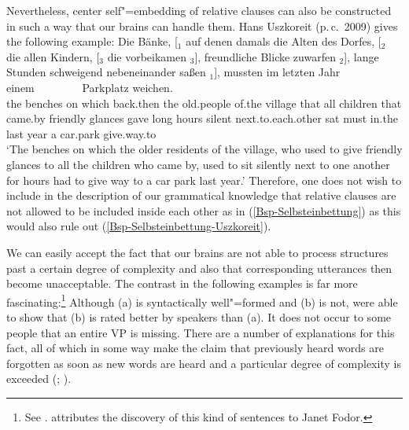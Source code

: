 Nevertheless, center self"=embedding of relative clauses can also be constructed in such a way that our brains can handle them. Hans
Uszkoreit (p.\,c.\ 2009)
gives the following example:
\ea
\label{Bsp-Selbsteinbettung-Uszkoreit}
\gll Die Bänke, [$_1$ auf denen damals die Alten des Dorfes, [$_2$ die allen Kindern, [$_3$ die vorbeikamen $_3$], freundliche Blicke zuwarfen $_2$], 
lange Stunden schweigend nebeneinander saßen $_1$], mussten im letzten Jahr einem~~~~~~~~ Parkplatz weichen.\\
the benches {} on which back.then the old.people of.the village {} that all children {} that came.by {} friendly glances gave {}
long hours silent next.to.each.other sat {} must in.the last year a car.park give.way.to\\
\glt `The benches on which the older residents of the village, who used to give friendly glances to all the children who came by, used to sit silently next to one 
another for hours had to give way to a car park last year.'
\z
Therefore, one does not wish to include in the description of our grammatical knowledge that
relative clauses are not allowed to be included inside each other as in (\ref{Bsp-Selbsteinbettung})  
as this would also rule out (\ref{Bsp-Selbsteinbettung-Uszkoreit}).

\addlines[-1]
We can easily accept the fact that our brains are not able to process structures past a certain degree of complexity and also that corresponding utterances then become unacceptable.
The contrast in the following examples is far more fascinating:\footnote{%
See . \citet[]{Frazier85a-u} 
attributes the discovery of this kind of sentences to Janet Fodor.
}
\eal
{}
\zl
Although (a)  is syntactically well"=formed and (b) is not, \citet{GT99a} were able to
show that (b) is rated better by speakers than (a). It does not occur to some people that an entire
VP is missing. There are a number of explanations for this fact, all of which in
some way make the claim that previously heard words are forgotten as soon as new words are heard and
a particular degree of complexity is exceeded (\citealp[]{Frazier85a-u}; \citealp{GT99a}). 

